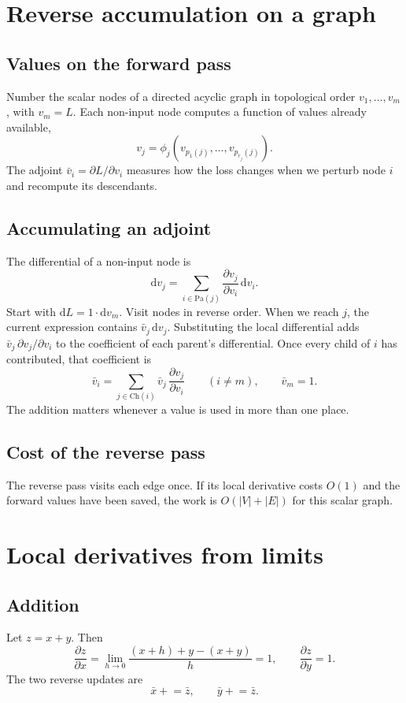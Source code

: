 \documentclass[11pt,a4paper]{article}
\newcommand{\dd}{\mathrm{d}}
\begin{document}
\section{Reverse accumulation on a graph}
\subsection{Values on the forward pass}
Number the scalar nodes of a directed acyclic graph in topological order
$v_1,\ldots,v_m$, with $v_m=L$. Each non-input node computes a function
of values already available,
\[
v_j=\phi_j\!\left(v_{p_1(j)},\ldots,v_{p_{r_j}(j)}\right).
\]
The adjoint $\bar v_i=\partial L/\partial v_i$ measures how the loss changes
when we perturb node $i$ and recompute its descendants.

\subsection{Accumulating an adjoint}
The differential of a non-input node is
\[
\dd v_j=\sum_{i\in\mathrm{Pa}(j)}
\frac{\partial v_j}{\partial v_i}\,\dd v_i.
\]
Start with $\dd L=1\cdot\dd v_m$. Visit nodes in reverse order. When we
reach $j$, the current expression contains $\bar v_j\,\dd v_j$.
Substituting the local differential adds
$\bar v_j\,\partial v_j/\partial v_i$ to the coefficient of each parent's
differential. Once every child of $i$ has contributed, that coefficient is
\[
\boxed{\displaystyle
\bar v_i=\sum_{j\in\mathrm{Ch}(i)}\bar v_j\,
\frac{\partial v_j}{\partial v_i}}
\qquad (i\ne m),\qquad \bar v_m=1.
\]
The addition matters whenever a value is used in more than one place.

\subsection{Cost of the reverse pass}
The reverse pass visits each edge once. If its local derivative costs
$O(1)$ and the forward values have been saved, the work is $O(|V|+|E|)$
for this scalar graph.

\section{Local derivatives from limits}
\subsection{Addition}
Let $z=x+y$. Then
\[
\frac{\partial z}{\partial x}
=\lim_{h\to0}\frac{(x+h)+y-(x+y)}{h}=1,\qquad
\frac{\partial z}{\partial y}=1.
\]
The two reverse updates are
\[
\bar x \mathrel{+}= \bar z,\qquad \bar y \mathrel{+}= \bar z.
\]
\end{document}
